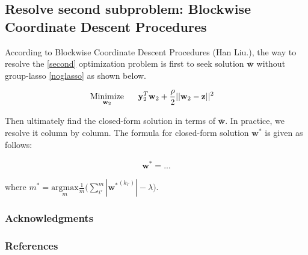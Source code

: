 \documentclass{article} %
\newcommand{\argmax}[1]{\underset{#1}{\text{argmax} }}
\newcommand{\LTwoNorm}[1]{||#1||^{2}}
\newcommand{\wtwo}{\mathbf{w}_2}
\newcommand{\w}{\mathbf{w}}
\newcommand{\wbar}{\overline{\w}}
\newcommand{\wopt}{\mathbf{w^{*}}}
\newcommand{\z}{\mathbf{z}}
\newcommand{\quadraterm}[1]{\frac{\rho}{2}\LTwoNorm{\w_{#1}-\z}}
\newcommand{\minimize}[1]{ \underset{#1}{\text{Minimize}} }
\newcommand{\hs}{\hspace*{0.6cm}}
\begin{document}
\subsection{Resolve second subproblem: Blockwise Coordinate Descent Procedures} 
According to Blockwise Coordinate Descent Procedures (Han Liu.), the way to
resolve the \eqref{second} optimization problem is first to seek solution $\wbar$ without
group-lasso \eqref{noglasso} as shown below. 

\begin{align} \label{noglasso}
   \minimize{\wtwo}
   \hs & \mutw{2} + \quadraterm{2} 
 \end{align}

\newcommand{\ms}{m^{*}}
Then ultimately find the closed-form solution in terms of $\wbar$. In
practice, we resolve it column by column. The formula for closed-form
solution $\wopt$ is given as follows:

\begin{align}
    \wopt = ...
\end{align}

where $\ms = \argmax{m} \frac{1}{m} \big(\sum_{i'}^{m} |\wopt^{(k_{i'})}| -
\lambda \big)$.

\subsubsection*{Acknowledgments}

\subsubsection*{References}
\small{

}
\end{document}
